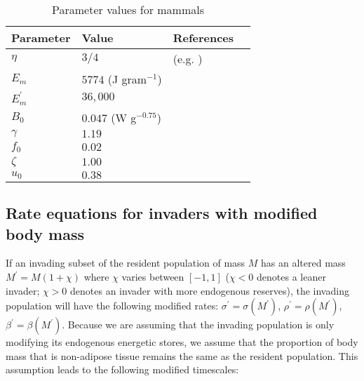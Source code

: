 \documentclass{pnastwo}
\begin{document}
\begin{article}



 \begin{table}[h]
\caption{Parameter values for mammals}
\label{param}
    \begin{center}
    \small
     \begin{tabular}{ p{1.2cm} p{3.2cm} l p{2.2cm}|}
     \hline
     Parameter & Value & References  \\
     \hline
   $\eta$ & $3/4$  &  (e.g. \cite{West:2001bv,moses2008rmo,hou}) \\ 
   $E_{m}$ & $5774$ (J gram$^{-1}$)  &  \cite{moses2008rmo,West:2001bv,hou} \\ 
   $E_{m}^{\prime}$ & $36,000$  & \cite{stryer,hou} \\ 
   $B_{0}$ & $0.047$ (W g$^{-0.75}$)    & \cite{hou}  \\
   $\gamma$ & $1.19$ & \cite{Lindstedt:1985hm} \\ 
   $f_{0}$ & $0.02$ & \cite{Lindstedt:1985hm}\\ 
   $\zeta$ & $1.00$  & \cite{Lindstedt:2002td} \\ 
   $u_{0}$ & $0.38$  & \cite{Lindstedt:2002td} \\ 
      
   \hline
    \end{tabular}
    \end{center}
   \end{table}


\subsection*{Rate equations for invaders with modified body mass}
If an invading subset of the resident population of mass $M$ has an altered mass $M^\prime = M(1+\chi)$ where $\chi$ varies between $[-1,1]$ ($\chi<0$ denotes a leaner invader; $\chi > 0$ denotes an invader with more endogenous reserves), the invading population will have the following modified rates: $\sigma^\prime = \sigma(M^\prime)$, $\rho^\prime = \rho(M^\prime)$, $\beta^\prime = \beta(M^\prime)$.
Because we are assuming that the invading population is only modifying its endogenous energetic stores, we assume that the proportion of body mass that is non-adipose tissue remains the same as the resident population.
This assumption leads to the following modified timescales:


\end{article}
\end{document}
